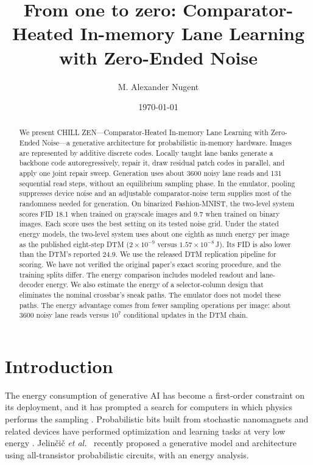 \documentclass[reprint,amsmath,amssymb,aps,nofootinbib]{revtex4-2}
\begin{document}
\title{From one to zero: Comparator-Heated In-memory Lane Learning
  with Zero-Ended Noise}

\author{M. Alexander Nugent}

\date{\today}

\begin{abstract}
We present CHILL ZEN---Comparator-Heated In-memory Lane Learning
with Zero-Ended Noise---a generative architecture for probabilistic
in-memory hardware. Images are represented by additive discrete codes.
Locally taught lane banks generate a backbone code autoregressively,
repair it, draw residual patch codes in parallel, and apply one joint
repair sweep. Generation uses about 3600 noisy lane reads and 131
sequential read steps, without an equilibrium sampling phase.
In the emulator, pooling suppresses device noise and an adjustable
comparator-noise term supplies most of the randomness needed for
generation. On binarized Fashion-MNIST, the two-level system scores FID 18.1 when
trained on grayscale images and 9.7 when trained on binary images. Each
score uses the best setting on its tested noise grid. Under the stated energy models, the two-level system uses about one
eighth as much energy per image as the published eight-step DTM
($2\times10^{-9}$ versus $1.57\times10^{-8}$\,J). Its FID is also lower
than the DTM's reported 24.9. We use the released DTM replication pipeline for scoring. We have not
verified the original paper's exact scoring procedure, and the training
splits differ. The energy comparison
includes modeled readout and lane-decoder energy. We also estimate the energy of a selector-column design that eliminates
the nominal crossbar's sneak paths. The emulator does not model these
paths. The energy advantage comes from fewer sampling operations per image:
about 3600 noisy lane reads versus $10^7$ conditional updates in the DTM
chain.
\end{abstract}

\maketitle

\section{Introduction}\label{sec:intro}

The energy consumption of generative AI has become a first-order
constraint on its deployment, and it has prompted a search for
computers in which physics performs the sampling
\cite{conte2019thermodynamic}. Probabilistic bits built from stochastic nanomagnets and related devices
have performed optimization and learning tasks at very low energy
\cite{sutton2017intrinsic,borders2019integer,niazi2024training}.
Jelin\v{c}i\v{c} \emph{et al.}\ \cite{jelincic2025dtm} recently
proposed a generative model and architecture using all-transistor
probabilistic circuits, with an energy analysis.
\end{document}
